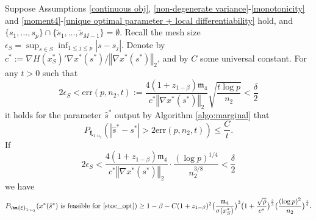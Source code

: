 \documentclass[mnsc,blindrev]{informs4} %
\newcommand{\norm}[1]{\left \Vert #1 \right\Vert}
\newcommand{\abs}[1]{\left \vert #1 \right\vert}
\begin{document}
 \begin{theorem}\label{finite sample error:gaussian+differentiable constraint}
 Suppose Assumptions \ref{continuous obj}, \ref{non-degenerate variance}-\ref{monotonicity} and \ref{moment4}-\ref{unique optimal parameter + local differentiability} hold, and $\{s_1,\ldots,s_p\}\cap \{\tilde s_1,\ldots,\tilde s_{M-1}\}=\emptyset$. Recall the mesh size $\epsilon_S = \sup_{s\in S}\inf_{1\leq j\leq p}\abs{s-s_j}$. Denote by $c^*:=\nabla H(x^*_S)'\nabla x^*(s^*)/\norm{\nabla x^*(s^*)}_2$, and by $C$ some universal constant. For any $t>0$ such that
\begin{equation*}
   2\epsilon_S<\mathrm{err}(p,n_2,t):=\frac{4(1+z_{1-\beta})\mathfrak{m}_4}{c^*\norm{\nabla x^*(s^*)}_2}\sqrt{\frac{t\log p}{n_2}}<\frac{\delta}{2}
\end{equation*}
it holds for the parameter $\hat s^*$ output by Algorithm \ref{algo:marginal} that
\begin{equation*}
P_{\bm{\xi}_{1:n_2}}(\abs{\hat s^*-s^*}>2\mathrm{err}(p,n_2,t))\leq \frac{C}{t}.
\end{equation*}
If
 \begin{equation*}
     2\epsilon_S<\frac{4(1+z_{1-\beta})\mathfrak{m}_4}{c^*\norm{\nabla x^*(s^*)}_2}\cdot \frac{(\log p)^{1/4}}{n_2^{3/8}}<\frac{\delta}{2}
 \end{equation*}
 we have
 \begin{equation}\label{feasibility error:gaussian+differentiable constraint}
    P_{\bm{\xi}_{1:n_2}}(x^*(\hat{s}^*)\text{ is feasible for \eqref{stoc_opt}})\geq 1-\beta-C(1+z_{1-\beta})^2\big(\frac{\mathfrak{m}_4}{\sigma(x^*_S)}\big)^3\big(1+\frac{\sqrt{\bar{\rho}}}{c^*}\big)^{\frac{2}{3}}\big(\frac{(\log p)^2}{n_2}\big)^{\frac{1}{4}}.
 \end{equation}
 \end{theorem}
\end{document}
